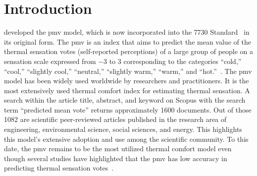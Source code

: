 \section{Introduction}\label{sec:introduction}
 developed the \ac{pmv} model, which is now incorporated into the \gls{7730} Standard~\cite{iso7730} in its original form.
The \ac{pmv} is an index that aims to predict the mean value of the thermal sensation votes (self-reported perceptions) of a large group of people on a sensation scale expressed from \num{-3} to \num{3} corresponding to the categories ``cold,'' ``cool,'' ``slightly cool,'' ``neutral,'' ``slightly warm,'' ``warm,'' and ``hot.''~\cite{iso7730, ashrae552023}.
The \ac{pmv} model has been widely used worldwide by researchers and practitioners.
It is the most extensively used thermal comfort index for estimating thermal sensation.
A search within the article title, abstract, and keyword on Scopus with the search term ``predicted mean vote'' returns approximately \num{1600} documents.
Out of those \num{1082} are scientific peer-reviewed articles published in the research area of engineering, environmental science, social sciences, and energy.
This highlights this model's extensive adoption and use among the scientific community.
To this date, the \ac{pmv} remains to be the most utilized thermal comfort model even though several studies have highlighted that the \ac{pmv} has low accuracy in predicting thermal sensation votes~\cite{Cheung2019, Yao2022, kim2019thermal, tartarini2018thermal, Humphreys2002, doherty_evaluation_1988, tartarini_prediction_2023}.

